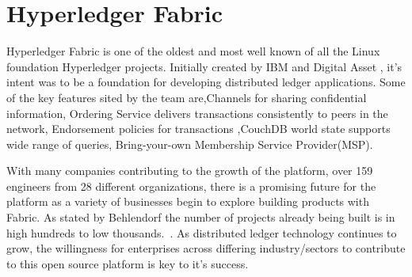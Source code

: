 \section{Hyperledger Fabric}


Hyperledger Fabric  is one of the oldest and most well known of all the
Linux foundation Hyperledger projects. Initially created by IBM and
Digital Asset , it's intent was to be a foundation for developing
distributed ledger applications. Some of the key features sited by the
team are,Channels for sharing confidential information, Ordering
Service delivers transactions consistently to peers in the network,
Endorsement policies for transactions ,CouchDB world state supports
wide range of queries, Bring-your-own Membership Service
Provider(MSP).~\cite{hid-sp18-414-Hyperledger_Fabric}

With many companies contributing to the growth of the platform, over
159 engineers from 28 different organizations, there is a promising future for the platform as a
variety of businesses begin to explore building products with
Fabric. As stated by Behlendorf the number of projects already being
built is in high hundreds to low thousands.~\cite{hid-sp18-414-Behlendorf_Interview}. 
As distributed ledger technology continues to grow, the
willingness for enterprises across differing industry/sectors to
contribute to this open source platform is key to it's success.

